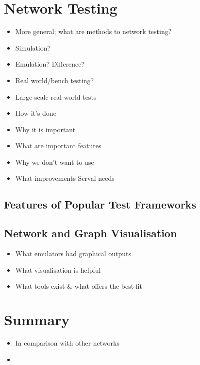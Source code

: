 \section{Network Testing}

\begin{itemize}
    \item More general; what are methods to network testing?
    \item Simulation?
    \item Emulation? Difference?
    \item Real world/bench testing?
    \item Large-scale real-world tests
    \item How it's done
    \item Why it is important
    \item What are important features
    \item Why we don't want to use 
    \item What improvements Serval needs
\end{itemize}

\subsection{Features of Popular Test Frameworks}


\subsection{Network and Graph Visualisation}
\begin{itemize}
    \item What emulators had graphical outputs
    \item What visualisation is helpful
    \item What tools exist \& what offers the best fit
\end{itemize}


\section{Summary}
\begin{itemize}
    \item In comparison with other networks
    \item 
\end{itemize}
